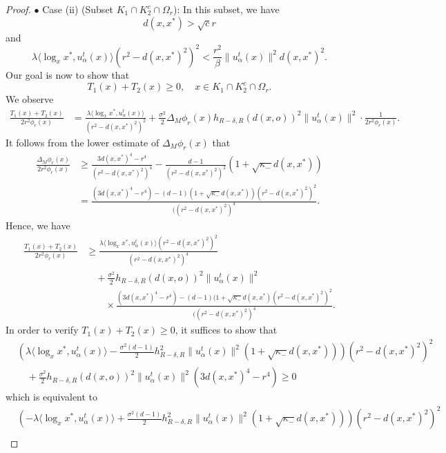 \documentclass[11pt]{amsart}
\newcommand{\p}{o}%
\newcommand{\dist}{d}%
\begin{document}
\begin{proof}
\noindent $\bullet$ Case (ii) (Subset $K_1\cap K_2^c \cap \Omega_r$):  In this subset, we have
\[
d(x,x^*)>\sqrt cr 
\]
and  
\[
\lambda \langle \log_xx^*,u_\alpha^t(x)\rangle (r^2 - d(x,x^*)^2)^2 < \frac{r^2}{\beta} \|u_\alpha^t(x)\|^2 d(x,x^*)^2 .
\]
Our goal is now to show that 
\[
T_1(x) +T_2(x) \geq0, \quad x \in K_1\cap K_2^c \cap \Omega_r.
\]
 We observe
\begin{align*}
\frac{T_1(x) + T_2(x)}{2r^2\phi_r(x)}& =   \frac{  \lambda \langle \log_xx^*,u_\alpha^t(x)\rangle }{  (r^2- d(x,x^*)^2)^2 } + \frac{\sigma^2}{2} \Delta_M \phi_r(x) h_{R-\delta,R}\left(\dist(x, \p)\right)^2 \|u_\alpha^t(x)\|^2 \cdot \frac{1}{2r^2\phi_r(x)}.
\end{align*}
It follows from the lower estimate of $\Delta_{M}\phi_r(x)$ that 
\begin{align*}
 \frac{\Delta_M \phi_r(x)}{2r^2 \phi_r(x)} &\geq \frac{  3d(x,x^*)^4-r^4 }{   (r^2 - d(x,x^*)^2)^4 }    - \frac{  d-1  }{  (r^2-d(x,x^*)^2)^2} (1+\sqrt{\kappa_-} d(x,x^*)) \\
& = \frac{     (3d(x,x^*)^4-r^4  )  -(d-1)(1+\sqrt{\kappa_-}d(x,x^*)) (r^2 - d(x,x^*)^2)^2  }{    ((r^2 - d(x,x^*)^2)^4       } .
\end{align*}
Hence, we have
\begin{align*}
\frac{T_1(x) + T_2(x)}{2r^2\phi_r(x)} & \geq \frac{  \lambda \langle \log_xx^*,u_\alpha^t(x)\rangle (r^2- d(x,x^*)^2)^2 }{  (r^2- d(x,x^*)^2)^4 } \\
&\quad + \frac{\sigma^2  }{2} h_{R-\delta,R}\left(\dist(x, \p)\right)^2 \|u_\alpha^t(x)\|^2  \\
&\quad\quad \times \frac{     (3d(x,x^*)^4-r^4  )  -(d-1)(1+\sqrt{\kappa_-}d(x,x^*) (r^2 - d(x,x^*)^2)^2  }{  (  (r^2 - d(x,x^*)^2)^4     }  .
\end{align*}
In order to verify $T_1(x)+T_2(x)\geq0$, it suffices to show that
\begin{align*}
&\left(     \lambda \langle \log_xx^*,u_\alpha^t(x)\rangle   - \frac{\sigma^2  (d-1)}{2} h_{R-\delta,R}^2\|u_\alpha^t(x)\|^2 (1+\sqrt{\kappa_-} d(x,x^*) )\right) (r^2 - d(x,x^*)^2)^2\\
& \quad + \frac{\sigma^2   }{2}  h_{R-\delta,R}\left(\dist(x, \p)\right)^2\|u_\alpha^t(x)\|^2   (3d(x,x^*)^4-r^4  )  \geq 0
\end{align*}
which is equivalent to 
\begin{align*}
&\left(    -\lambda \langle \log_xx^*,u_\alpha^t(x)\rangle   + \frac{\sigma^2   (d-1)}{2} h_{R-\delta,R}^2\|u_\alpha^t(x)\|^2 (1+\sqrt{\kappa_-} d(x,x^*) )\right) (r^2 - d(x,x^*)^2)^2 \\

\end{align*}
\end{proof}
\end{document}

